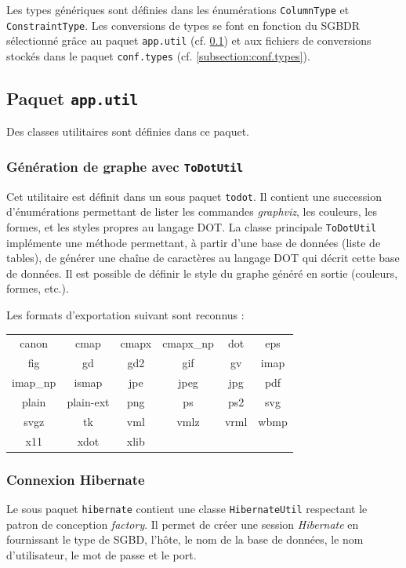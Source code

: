 Les types génériques sont définies dans les énumérations \texttt{ColumnType} et \texttt{ConstraintType}. Les conversions de types se font en fonction du SGBDR sélectionné grâce au paquet \texttt{app.util} (cf. \ref{subsection:app.util}) et aux fichiers de conversions stockés dans le paquet \texttt{conf.types} (cf. \ref{subsection:conf.types}).

\subsection{Paquet \texttt{app.util}}
\label{subsection:app.util}

Des classes utilitaires sont définies dans ce paquet.

\subsubsection{Génération de graphe avec \texttt{ToDotUtil}}
\label{section:ToDotUtil}
Cet utilitaire est définit dans un sous paquet \texttt{todot}. Il contient une succession d'énumérations permettant de lister les commandes \emph{graphviz}, les couleurs, les formes, et les styles propres au langage DOT.
La classe principale \texttt{ToDotUtil} implémente une méthode permettant, à partir d'une base de données (liste de tables), de générer une chaîne de caractères au langage DOT qui décrit cette base de données. Il est possible de définir le style du graphe généré en sortie (couleurs, formes, etc.).

Les formats d'exportation suivant sont reconnus : 

\begin{center}
\begin{tabular}{c c c c c c}
canon&cmap&cmapx&cmapx\_np&dot&eps \\
fig & gd & gd2 & gif & gv & imap \\
imap\_np & ismap & jpe & jpeg & jpg & pdf \\
plain & plain-ext & png & ps & ps2 & svg \\
svgz & tk & vml & vmlz & vrml & wbmp \\
x11 & xdot & xlib & & & \\
\end{tabular}
\end{center}

\subsubsection{Connexion Hibernate}
Le sous paquet \texttt{hibernate} contient une classe \texttt{HibernateUtil} respectant le patron de conception \emph{factory}. Il permet de créer une session \emph{Hibernate} en fournissant le type de SGBD, l'hôte, le nom de la base de données, le nom d'utilisateur, le mot de passe et le port.

